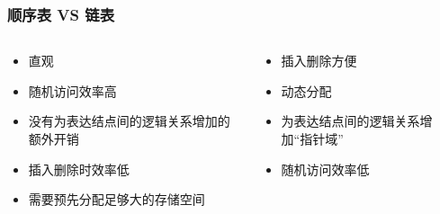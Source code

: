 \begin{frame}[fragile]
  \frametitle{顺序表 VS 链表}
  \begin{columns}
    \begin{column}[T]{0.5\linewidth}
      \begin{tcolorbox}[colframe=red, title=顺序表优点]
        \begin{itemize}
        \item 直观
        \item 随机访问效率高
        \item 没有为表达结点间的逻辑关系增加的额外开销
        \end{itemize}
      \end{tcolorbox}

      \begin{tcolorbox}[colframe=red, title=顺序表缺点]
        \begin{itemize}
        \item 插入删除时效率低
        \item 需要预先分配足够大的存储空间
        \end{itemize}
      \end{tcolorbox}
    \end{column}
    \begin{column}[T]{0.5\linewidth}
\begin{tcolorbox}[colframe=red, title=链表优点]
        \begin{itemize}
        \item 插入删除方便
        \item 动态分配
        \end{itemize}
      \end{tcolorbox}

      \begin{tcolorbox}[colframe=red, title=链表缺点]
        \begin{itemize}
        \item 为表达结点间的逻辑关系增加“指针域”
        \item 随机访问效率低
        \end{itemize}
      \end{tcolorbox}
    \end{column}
  \end{columns}
\end{frame}


